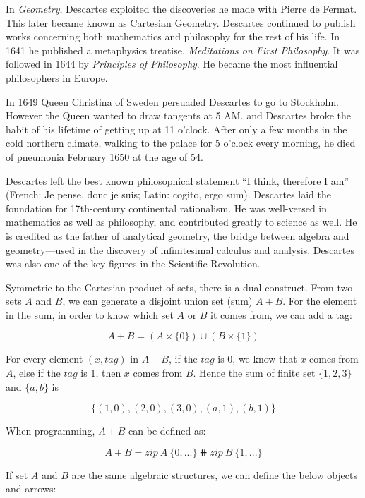 \documentclass{article}
\begin{document}
In {\em Geometry}, Descartes exploited the discoveries he made with Pierre de Fermat. This later became known as Cartesian Geometry. Descartes continued to publish works concerning both mathematics and philosophy for the rest of his life. In 1641 he published a metaphysics treatise, {\em Meditations on First Philosophy}. It was followed in 1644 by {\em Principles of Philosophy}. He became the most influential philosophers in Europe.

In 1649 Queen Christina of Sweden persuaded Descartes to go to Stockholm. However the Queen wanted to draw tangents at 5 AM. and Descartes broke the habit of his lifetime of getting up at 11 o'clock. After only a few months in the cold northern climate, walking to the palace for 5 o'clock every morning, he died of pneumonia February 1650 at the age of 54.

Descartes left the best known philosophical statement ``I think, therefore I am'' (French: Je pense, donc je suis; Latin: cogito, ergo sum). Descartes laid the foundation for 17th-century continental rationalism. He was well-versed in mathematics as well as philosophy, and contributed greatly to science as well. He is credited as the father of analytical geometry, the bridge between algebra and geometry—used in the discovery of infinitesimal calculus and analysis. Descartes was also one of the key figures in the Scientific Revolution.

\vspace{5mm}

Symmetric to the Cartesian product of sets, there is a dual construct. From two sets $A$ and $B$, we can generate a disjoint union set (sum) $A + B$. For the element in the sum, in order to know which set $A$ or $B$ it comes from, we can add a tag:

\[
A + B = (A \times \{0\}) \cup (B \times \{1\})
\]

For every element $(x, tag)$ in $A + B$, if the $tag$ is 0, we know that $x$ comes from $A$, else if the $tag$ is 1, then $x$ comes from $B$. Hence the sum of finite set $\{1, 2, 3\}$ and $\{a, b\}$ is

\[
\{(1, 0), (2, 0), (3, 0), (a, 1), (b, 1)\}
\]

When programming, $A + B$ can be defined as:

\begin{mdframed}
\[
A + B = zip\ A\ \{0, ...\} \doubleplus zip\ B\ \{1, ...\}
\]
\end{mdframed}

If set $A$ and $B$ are the same algebraic structures, we can define the below objects and arrows:
\end{document}
